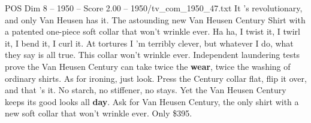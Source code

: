 \begin{textsample}{POS Dim 8 – 1950 – Score 2.00 – 1950/tv\_com\_1950\_47.txt}  \label{ex:f8_pos_009}
It 's revolutionary, and only Van Heusen has it.
The astounding new Van Heusen Century Shirt with a patented one-piece soft collar that won't wrinkle ever.
Ha ha, I twist it, I twirl it, I bend it, I curl it.
At tortures I 'm terribly clever, but whatever I do, what they say is all true.
This collar won't wrinkle ever.
Independent laundering tests prove the Van Heusen Century can take twice the \textbf{wear}, twice the washing of ordinary shirts.
As for ironing, just look.
Press the Century collar flat, flip it over, and that 's it.
No starch, no stiffener, no stays.
Yet the Van Heusen Century keeps its good looks all \textbf{day}.
Ask for Van Heusen Century, the only shirt with a new soft collar that won't wrinkle ever.
Only \$395.

\end{textsample}
